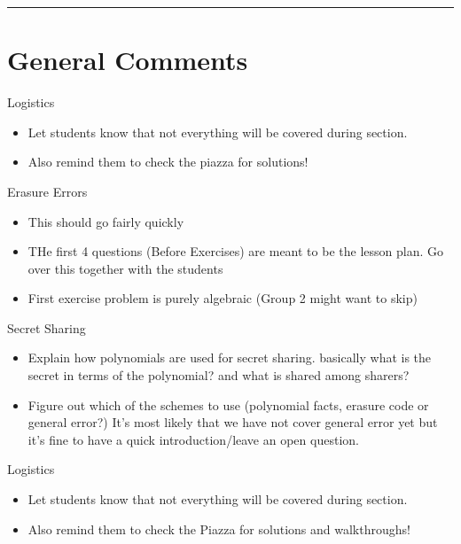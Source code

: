 \documentclass{exam}
\title{}
\date{Polynomials, Secret Sharing, Erasure Errors, General Errors, Self Reference}
\begin{document}
\maketitle
\rule{\textwidth}{0.15em}
\fontsize{12}{15}\selectfont
\thispagestyle{empty}

\section{General Comments}
\begin{questions}
\item Logistics
\begin{itemize}
\item Let students know that not everything will be covered during section. 
\item Also remind them to check the piazza for solutions!
\end{itemize}
\item Erasure Errors
\begin{itemize}
\item This should go fairly quickly
\item THe first 4 questions (Before Exercises) are meant to be the lesson plan. Go over this together with the students
\item First exercise problem is purely algebraic (Group 2 might want to skip)
\end{itemize}

\item Secret Sharing
\begin{itemize}
\item Explain how polynomials are used for secret sharing. basically what is the secret in terms of the polynomial? and what is shared among sharers?
\item Figure out which of the schemes to use (polynomial facts, erasure code or general error?) It's most likely that we have not cover general error yet but it's fine to have a quick introduction/leave an open question.
\end{itemize}

	\item Logistics
	\begin{itemize}
		\item Let students know that not everything will be covered during section. 
		\item Also remind them to check the Piazza for solutions and walkthroughs!
	\end{itemize}


\end{questions}
\end{document}

